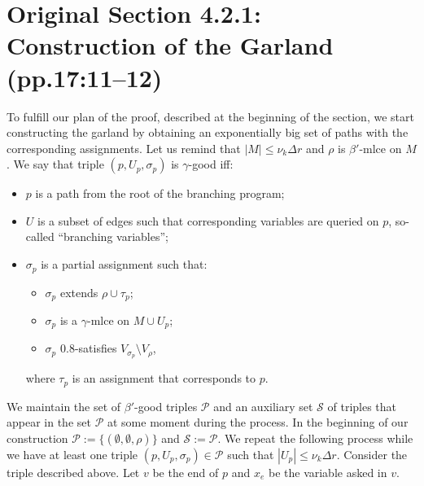 \section*{Original Section 4.2.1: Construction of the Garland (pp.17:11--12)}
To fulfill our plan of the proof, described at the beginning of the section, we start constructing the garland by obtaining an exponentially big set of paths with the corresponding assignments. Let us remind that $|M|\le\nu_k\Delta r$ and $\rho$ is $\beta'$-mlce on $M$.
We say that triple $(p,U_p,\sigma_p)$ is $\gamma$-good iff:
\begin{itemize}\item $p$ is a path from the root of the branching program;
\item $U$ is a subset of edges such that corresponding variables are queried on $p$, so-called ``branching variables'';
\item $\sigma_p$ is a partial assignment such that:
\begin{itemize}\item $\sigma_p$ extends $\rho\cup\tau_p$;
\item $\sigma_p$ is a $\gamma$-mlce on $M\cup U_p$;
\item $\sigma_p$ $0.8$-satisfies $V_{\sigma_p}\setminus V_\rho$,
\end{itemize}
where $\tau_p$ is an assignment that corresponds to $p$.\end{itemize}
We maintain the set of $\beta'$-good triples $\mathcal P$ and an auxiliary set $\mathcal S$ of triples that appear in the set $\mathcal P$ at some moment during the process. In the beginning of our construction $\mathcal P:=\{(\emptyset,\emptyset,\rho)\}$ and $\mathcal S:=\mathcal P$.
We repeat the following process while we have at least one triple $(p,U_p,\sigma_p)\in\mathcal P$ such that $|U_p|\le\nu_k\Delta r$.
Consider the triple described above. Let $v$ be the end of $p$ and $x_e$ be the variable asked in $v$.
